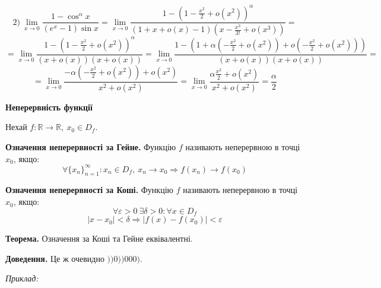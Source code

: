 \documentclass[12pt]{report}
\begin{document}
$$2)\ \lim_{x\to 0} \frac{1 - \cos^{\alpha}x}{(e^x - 1)\sin x} = \lim_{x\to 0} \frac{1 - (1 - \frac{x^2}{2} + o(x^2))^{\alpha}}{(1 + x + o(x)-1)(x - \frac{x^3}{3!} + o(x^3))} = $$
$$= \lim_{x\to 0} \frac{1 - (1 - \frac{x^2}{2} + o(x^2))^{\alpha}}{(x + o(x))(x + o(x))} =\lim_{x\to 0} \frac{1 - (1 + \alpha (-\frac{x^2}{2} + o(x^2)) + o(-\frac{x^2}{2} + o(x^2)))}{(x + o(x))(x + o(x))} =$$
$$=\lim_{x\to 0} \frac{-\alpha (-\frac{x^2}{2} + o(x^2)) + o(x^2)}{x^2 + o(x^2)} = \lim_{x\to 0} \frac{\alpha \frac{x^2}{2} + o(x^2)}{x^2 + o(x^2)} = \frac{\alpha}{2}$$

\vspace{5mm}

\begin{center}
    \textbf{\Large Неперервність функції}
\end{center}

Нехай $f : \mathbb{R} \to \mathbb{R},\ x_0 \in D_f$.

\textbf{Означення неперервності за Гейне.} Функцію $f$ називають неперервною в точці $x_0$, якщо:
$$\forall \{ x_n\}_{n=1}^{\infty} : x_n \in D_f,\ x_n \to x_0 \Longrightarrow f(x_n) \to f(x_0)$$

\textbf{Означення неперервності за Коші.} Функцію $f$ називають неперервною в точці $x_0$, якщо:
$$\forall \varepsilon > 0 \ \exists \delta > 0 : \forall x \in D_f$$
$$|x - x_0| < \delta \Longrightarrow |f(x) - f(x_0)| < \varepsilon$$

\vspace{3mm}

\textbf{Теорема.} Означення за Коші та Гейне еквівалентні.

\textbf{Доведення.} Це ж очевидно $))0))000)$.

\textit{Приклад:}
\end{document}
